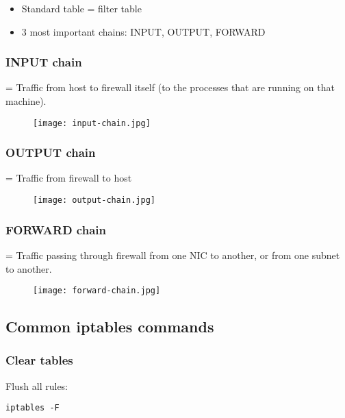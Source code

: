 \documentclass{article}
\begin{document}
\begin{itemize}
    \item Standard table = filter table
    \item 3 most important chains: INPUT, OUTPUT, FORWARD
\end{itemize}


\subsubsection{INPUT chain}

= Traffic from host to firewall itself (to the processes that are running on that machine).

\begin{figure}[H]
    \centering
    \texttt{[image: input-chain.jpg]}
\end{figure}

\subsubsection{OUTPUT chain}

= Traffic from firewall to host

\begin{figure}[H]
    \centering
    \texttt{[image: output-chain.jpg]}
\end{figure}

\subsubsection{FORWARD chain}

= Traffic passing through firewall from one NIC to another, or from one subnet to another.

\begin{figure}[H]
    \centering
    \texttt{[image: forward-chain.jpg]}
\end{figure}

\subsection{Common iptables commands}

\subsubsection{Clear tables}

Flush all rules:

\begin{verbatim}
iptables -F
\end{verbatim}
\end{document}
